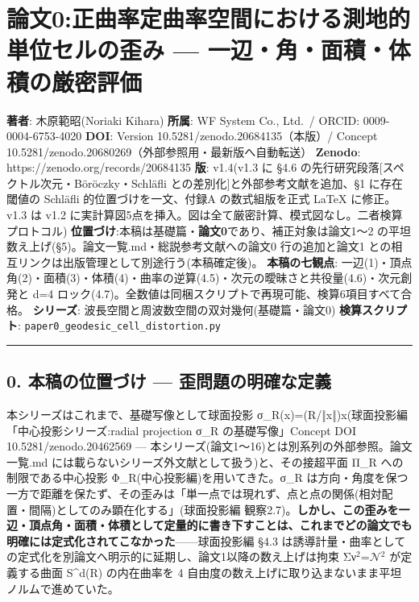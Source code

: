 \documentclass[
]{ltjsarticle}
\author{}
\date{}
\begin{document}
\section{論文0:正曲率定曲率空間における測地的単位セルの歪み ---
一辺・角・面積・体積の厳密評価}\label{ux8ad6ux65870ux6b63ux66f2ux7387ux5b9aux66f2ux7387ux7a7aux9593ux306bux304aux3051ux308bux6e2cux5730ux7684ux5358ux4f4dux30bbux30ebux306eux6b6aux307f-ux4e00ux8fbaux89d2ux9762ux7a4dux4f53ux7a4dux306eux53b3ux5bc6ux8a55ux4fa1}

\textbf{著者}: 木原範昭(Noriaki Kihara) \textbf{所属}: WF System Co.,
Ltd.~/ ORCID: 0009-0004-6753-4020 \textbf{DOI}: Version
10.5281/zenodo.20684135（本版）/ Concept
10.5281/zenodo.20680269（外部参照用・最新版へ自動転送） \textbf{Zenodo}:
https://zenodo.org/records/20684135 \textbf{版}: v1.4(v1.3 に §4.6
の先行研究段落{[}スペクトル次元・Böröczky・Schläfli
との差別化{]}と外部参考文献を追加、§1 に存在閾値の Schläfli
的位置づけを一文、付録A の数式組版を正式 LaTeX に修正。v1.3 は v1.2
に実計算図5点を挿入。図は全て厳密計算、模式図なし。二者検算プロトコル)
\textbf{位置づけ}:本稿は基礎篇・\textbf{論文0}であり、補正対象は論文1〜2
の平坦数え上げ(§5)。論文一覧.md・総説参考文献への論文0 行の追加と論文1
との相互リンクは出版管理として別途行う(本稿確定後)。
\textbf{本稿の七観点}:
一辺(1)・頂点角(2)・面積(3)・体積(4)・曲率の逆算(4.5)・次元の曖昧さと共役量(4.6)・次元創発と
d=4 ロック(4.7)。全数値は同梱スクリプトで再現可能、検算6項目すべて合格。
\textbf{シリーズ}: 波長空間と周波数空間の双対幾何(基礎篇・論文0)
\textbf{検算スクリプト}: \texttt{paper0\_geodesic\_cell\_distortion.py}

\begin{center}\rule{0.5\linewidth}{0.5pt}\end{center}

\subsection{0. 本稿の位置づけ ---
歪問題の明確な定義}\label{ux672cux7a3fux306eux4f4dux7f6eux3065ux3051-ux6b6aux554fux984cux306eux660eux78baux306aux5b9aux7fa9}

本シリーズはこれまで、基礎写像として球面投影
σ\_R(x)=(R/‖x‖)x(球面投影編「中心投影シリーズ:radial projection σ\_R
の基礎写像」Concept DOI 10.5281/zenodo.20462569 ---
本シリーズ(論文1〜16)とは別系列の外部参照。論文一覧.md
には載らないシリーズ外文献として扱う)と、その接超平面 Π\_R
への制限である中心投影 Φ\_R(中心投影編)を用いてきた。σ\_R
は方向・角度を保つ一方で距離を保たず、その歪みは「単一点では現れず、点と点の関係(相対配置・間隔)としてのみ顕在化する」(球面投影編
観察2.7)。\textbf{しかし、この歪みを一辺・頂点角・面積・体積として定量的に書き下すことは、これまでどの論文でも明確には定式化されてこなかった}------球面投影編
§4.3
は誘導計量・曲率としての定式化を別論文へ明示的に延期し、論文1以降の数え上げは拘束
Σν\(^{2}\)=\(\mathcal{N}\)\(^{2}\) が定義する曲面 S\^{}d(R) の内在曲率を
4 自由度の数え上げに取り込まないまま平坦ノルムで進めていた。
\end{document}
